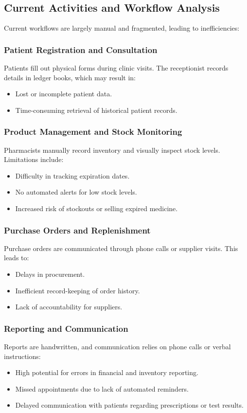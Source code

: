 \documentclass[12pt,a4paper]{report}
\begin{document}
\subsection{Current Activities and Workflow Analysis}
Current workflows are largely manual and fragmented, leading to inefficiencies:

\subsubsection{Patient Registration and Consultation}
Patients fill out physical forms during clinic visits. The receptionist records details in ledger books, which may result in:
\begin{itemize}
    \item Lost or incomplete patient data.
    \item Time-consuming retrieval of historical patient records.
\end{itemize}

\subsubsection{Product Management and Stock Monitoring}
Pharmacists manually record inventory and visually inspect stock levels. Limitations include:
\begin{itemize}
    \item Difficulty in tracking expiration dates.
    \item No automated alerts for low stock levels.
    \item Increased risk of stockouts or selling expired medicine.
\end{itemize}

\subsubsection{Purchase Orders and Replenishment}
Purchase orders are communicated through phone calls or supplier visits. This leads to:
\begin{itemize}
    \item Delays in procurement.
    \item Inefficient record-keeping of order history.
    \item Lack of accountability for suppliers.
\end{itemize}

\subsubsection{Reporting and Communication}
Reports are handwritten, and communication relies on phone calls or verbal instructions:
\begin{itemize}
    \item High potential for errors in financial and inventory reporting.
    \item Missed appointments due to lack of automated reminders.
    \item Delayed communication with patients regarding prescriptions or test results.
\end{itemize}
\end{document}
